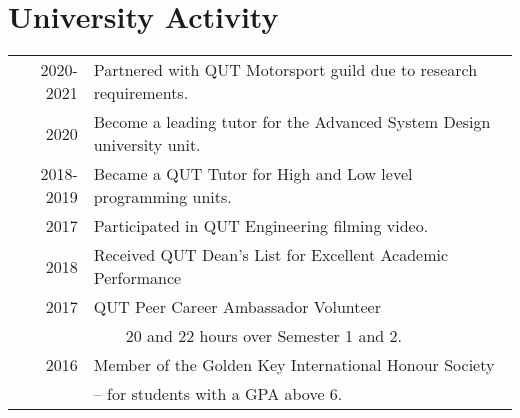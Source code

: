 \documentclass[a4paper,12pt]{article}
\newcommand{\tabitem}{~~\llap{\textbullet}~~}
\begin{document}
{
    {
\section{University Activity}
	\begin{tabular}{rl}
		\textsc{2020-2021} & Partnered with QUT Motorsport guild due to research requirements. \\	
		\textsc{2020} & Become a leading tutor for the Advanced System Design university unit. \\	
		\textsc{2018-2019} & Became a QUT Tutor for High and Low level programming units. \\
		\textsc{2017} & Participated in QUT Engineering filming video. \\
		\textsc{2018} & Received QUT Dean's List for Excellent Academic Performance \\
		\textsc{2017} & QUT Peer Career Ambassador Volunteer \\ 
		    & \tabitem 20 and 22 hours over Semester 1 and 2. \\
		\textsc{2016} & Member of the Golden Key International Honour Society \\&– for students with a GPA above 6. %
	\end{tabular}
	} {}
}
{}
\end{document}
